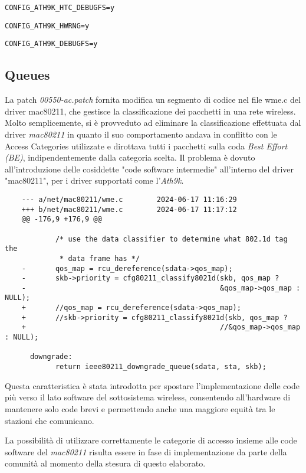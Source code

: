 \verb|CONFIG_ATH9K_HTC_DEBUGFS=y|

\verb|CONFIG_ATH9K_HWRNG=y|

\verb|CONFIG_ATH9K_DEBUGFS=y|

\subsection[Queues]{Queues}
La patch \textit{00550-ac.patch} fornita modifica un segmento di codice nel file wme.c del driver mac80211, che gestisce la classificazione dei pacchetti in una rete wireless.
Molto semplicemente, si è provveduto ad eliminare la classificazione effettuata dal driver \textit{mac80211} in quanto il suo comportamento andava in conflitto con le Access Categories utilizzate e dirottava tutti i pacchetti sulla coda \textit{Best Effort (BE)}, indipendentemente dalla categoria scelta.
Il problema è dovuto all'introduzione delle cosiddette "code software intermedie" all'interno del driver "mac80211", per i driver supportati \cite{intermediate_queue} come l'\textit{Ath9k}.

\begin{lstlisting}
    --- a/net/mac80211/wme.c        2024-06-17 11:16:29
    +++ b/net/mac80211/wme.c        2024-06-17 11:17:12
    @@ -176,9 +176,9 @@
     
            /* use the data classifier to determine what 802.1d tag the
             * data frame has */
    -       qos_map = rcu_dereference(sdata->qos_map);
    -       skb->priority = cfg80211_classify8021d(skb, qos_map ?
    -                                              &qos_map->qos_map : NULL);
    +       //qos_map = rcu_dereference(sdata->qos_map);
    +       //skb->priority = cfg80211_classify8021d(skb, qos_map ?
    +                                              //&qos_map->qos_map : NULL);
     
      downgrade:
            return ieee80211_downgrade_queue(sdata, sta, skb);
\end{lstlisting}
Questa caratteristica è stata introdotta per spostare l'implementazione delle code più verso il lato software del sottosistema wireless, consentendo all'hardware di mantenere solo code brevi e permettendo anche una maggiore equità tra le stazioni che comunicano.

La possibilità di utilizzare correttamente le categorie di accesso insieme alle code software del \textit{mac80211} risulta essere in fase di implementazione da parte della comunità al momento della stesura di questo elaborato.

